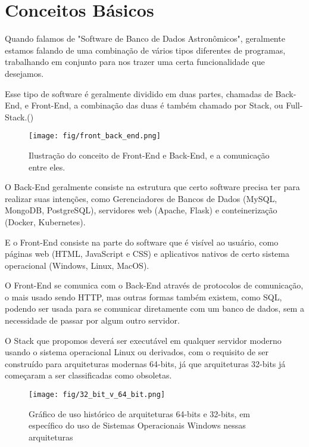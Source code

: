 \chapter{Conceitos Básicos}

Quando falamos de "Software de Banco de Dados Astronômicos", geralmente estamos falando de uma combinação de vários tipos diferentes de programas, trabalhando em conjunto para nos trazer uma certa funcionalidade que desejamos.

Esse tipo de software é geralmente dividido em duas partes, chamadas de Back-End, e Front-End, a combinação das duas é também chamado por Stack, ou Full-Stack.(\citealt{front_back_end})

\begin{figure}[!ht]
\begin{center}
\setcaptionmargin{1cm}
\texttt{[image: fig/front\_back\_end.png]}
\caption[Front-End/Back-End]{Ilustração do conceito de Front-End e Back-End, e a comunicação entre eles.} 
\label{front_back_end_fig}
\end{center}
\end{figure}

O Back-End geralmente consiste na estrutura que certo software precisa ter para realizar suas intenções, como Gerenciadores de Bancos de Dados (MySQL, MongoDB, PostgreSQL), servidores web (Apache, Flask) e conteinerização (Docker, Kubernetes).

E o Front-End consiste na parte do software que é visível ao usuário, como páginas web (HTML, JavaScript e CSS) e aplicativos nativos de certo sistema operacional (Windows, Linux, MacOS).

O Front-End se comunica com o Back-End através de protocolos de comunicação, o mais usado sendo HTTP, mas outras formas também existem, como SQL, podendo ser usada para se comunicar diretamente com um banco de dados, sem a necessidade de passar por algum outro servidor.\citealt{front_back_end}

O Stack que propomos deverá ser executável em qualquer servidor moderno usando o sistema operacional Linux ou derivados, com o requisito de ser construído para arquiteturas modernas 64-bits, já que arquiteturas 32-bits já começaram a ser classificadas como obsoletas.%

\begin{figure}[!ht]
\begin{center}
\setcaptionmargin{1cm}
\texttt{[image: fig/32\_bit\_v\_64\_bit.png]}
\caption[Uso histórico, 32-bit vs 64-bit]{Gráfico de uso histórico de arquiteturas 64-bits e 32-bits, em específico do uso de Sistemas Operacionais Windows nessas arquiteturas} 
\label{32_bit_vs_64_bit}
\end{center}
\end{figure}

